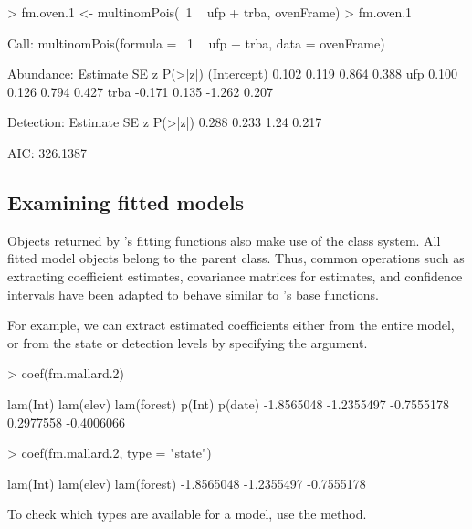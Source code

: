 \documentclass[article,shortnames]{jss}
\newcommand{\um}{\pkg{unmarked}}
\newcommand{\rlang}{\proglang{R}}
\begin{document}
{\begin{Schunk}
\begin{Sinput}
> fm.oven.1 <- multinomPois(~1 ~ ufp + trba, ovenFrame)
> fm.oven.1
\end{Sinput}
\begin{Soutput}
Call:
multinomPois(formula = ~1 ~ ufp + trba, data = ovenFrame)

Abundance:
            Estimate    SE      z P(>|z|)
(Intercept)    0.102 0.119  0.864   0.388
ufp            0.100 0.126  0.794   0.427
trba          -0.171 0.135 -1.262   0.207

Detection:
 Estimate    SE    z P(>|z|)
    0.288 0.233 1.24   0.217

AIC: 326.1387 
\end{Soutput}
\end{Schunk}


\subsection{Examining fitted models}
\label{sec:examining-model-fits}

Objects returned by \um's fitting functions also make use of the 
class system.  All fitted model objects belong to the 
parent class.  Thus, common operations such as extracting coefficient
estimates, covariance matrices for estimates, and confidence intervals
have been adapted to behave similar to \rlang's base functions.

For example, we can extract estimated coefficients either from the
entire model, or from the state or detection levels by specifying the
 argument.

\begin{Schunk}
\begin{Sinput}
> coef(fm.mallard.2)
\end{Sinput}
\begin{Soutput}
   lam(Int)   lam(elev) lam(forest)      p(Int)     p(date) 
 -1.8565048  -1.2355497  -0.7555178   0.2977558  -0.4006066 
\end{Soutput}
\begin{Sinput}
> coef(fm.mallard.2, type = "state")
\end{Sinput}
\begin{Soutput}
   lam(Int)   lam(elev) lam(forest) 
 -1.8565048  -1.2355497  -0.7555178 
\end{Soutput}
\end{Schunk}

To check which types are available for a model, use the  method.

}
\end{document}
